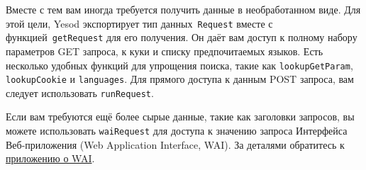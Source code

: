 Вместе с тем вам иногда требуется получить данные в необработанном
виде. Для этой цели, Yesod экспортирует тип данных~\lstinline!Request!
вместе с функцией~\lstinline!getRequest! для его получения. Он даёт
вам доступ к полному набору параметров GET запроса, к куки и списку
предпочитаемых языков. Есть несколько удобных функций для упрощения
поиска, такие как \lstinline!lookupGetParam!, \lstinline!lookupCookie!
и \lstinline!languages!. Для прямого доступа к данным POST запроса,
вам следует использовать \lstinline!runRequest!.

Если вам требуются ещё более сырые данные, такие как заголовки
запросов, вы можете использовать \lstinline!waiRequest! для доступа к
значению запроса Интерфейса Веб-приложения (Web Application Interface,
WAI). За деталями обратитесь к \hyperref[chap:web_application_interface]{приложению о WAI}.

